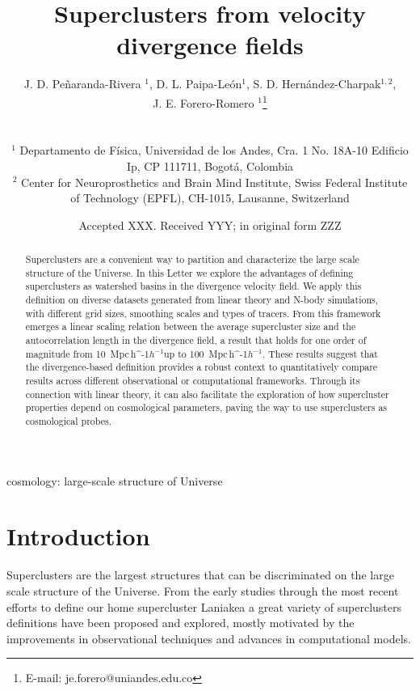 \documentclass[usenatbib]{mnras}
\title[Superclusters from velocity divergence fields]{Superclusters from velocity divergence fields}
\author[Pe\~naranda-Rivera et al.]{
\parbox[t]{\textwidth}{
    {J. D. Pe\~naranda-Rivera $^1$,} 
    {D. L. Paipa-Le\'on$^{1}$,}
    {S. D. Hern\'andez-Charpak$^{1,2}$,}\\
    {J. E. Forero-Romero $^{1}$\thanks{E-mail: je.forero@uniandes.edu.co}}
}
\\\\
$^{1}$ Departamento de F\'isica, Universidad de los Andes, Cra. 1
  No. 18A-10 Edificio Ip, CP 111711, Bogot\'a, Colombia \\
$^{2}$ Center for Neuroprosthetics and Brain Mind Institute, Swiss
  Federal Institute of Technology (EPFL), CH-1015, Lausanne,
  Switzerland\\  
}
\date{Accepted XXX. Received YYY; in original form ZZZ}
\newcommand{\Mpch}{\,{\rm Mpc}\,\ifmmode h^{-1}\else $h^{-1}$\fi}
\begin{document}
\label{firstpage}
\pagerange{\pageref{firstpage}--\pageref{lastpage}}
\maketitle

\maketitle
\begin{abstract}
Superclusters are a convenient way to partition and characterize the large scale structure of the Universe.
In this Letter we explore the advantages of defining superclusters as watershed basins in the divergence velocity field.
We apply this definition on diverse datasets generated from linear theory and  N-body simulations, with different grid sizes, smoothing scales and types of tracers.
From this framework emerges a linear scaling relation between the average supercluster size and the autocorrelation length in the divergence field, a result that holds for one order of magnitude from 10 \Mpch up to 100 \Mpch.
These results suggest that the divergence-based definition provides a robust context to quantitatively compare results across different observational or computational frameworks. 
Through its connection with linear theory, it can also facilitate the exploration of how supercluster properties depend on cosmological parameters, 
paving the way to use superclusters as cosmological probes.
\end{abstract}

\begin{keywords}
cosmology: large-scale structure of Universe
\end{keywords}




\section{Introduction}


Superclusters are the largest structures that can be discriminated on the large scale structure of the Universe. 
From the early studies \citep{1983ARA&A..21..373O} through the most recent efforts to define our home supercluster Laniakea \citep{2014Natur.513...71T} a great variety of superclusters definitions have been proposed and explored, mostly motivated by the improvements in observational techniques and advances in computational models. 
\end{document}
